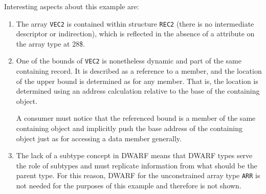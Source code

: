 Interesting aspects about this example are:
\begin{enumerate}[1. ]
\item The array \texttt{VEC2} is  contained within structure
\texttt{REC2} (there is no intermediate descriptor or indirection),
which is reflected in the absence of a 
attribute on the array type at 28\$.

\item One of the bounds of \texttt{VEC2} is nonetheless dynamic and part of
the same containing record. It is described as a reference to
a member, and the location of the upper bound is determined
as for any member. That is, the location is determined using
an address calculation relative to the base of the containing
object.  

A consumer must notice that the referenced bound is a
member of the same containing object and implicitly push the
base address of the containing object just as for accessing
a data member generally.

\item The lack of a subtype concept in DWARF means that DWARF types
serve the role of subtypes and must replicate information from
what should be the parent type. For this reason, DWARF for
the unconstrained array type \texttt{ARR} is not needed for the purposes
of this example and therefore is not shown.
\end{enumerate}

